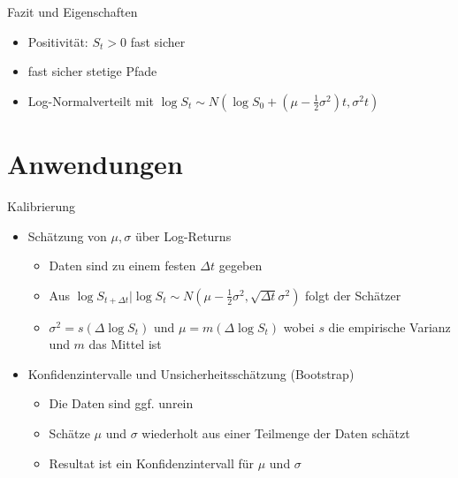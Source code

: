 \documentclass{beamer}
\begin{document}
\begin{frame}{Fazit und Eigenschaften}
  \begin{itemize}
      \item Positivität: $S_t>0$ fast sicher
      \item fast sicher stetige Pfade
      \item Log-Normalverteilt mit $\log S_t \sim N(\log S_0 + (\mu - \tfrac12 \sigma^2)t, \sigma^2 t)$
  \end{itemize}
\end{frame}

\section{Anwendungen}

\begin{frame}{Kalibrierung}
  \begin{itemize}
      \item Schätzung von $\mu,\sigma$ über Log-Returns
      \begin{itemize}
        \item Daten sind zu einem festen $\Delta t$ gegeben
        \item Aus $\log S_{t + \Delta t} \vert \log S_t \sim N(\mu - \tfrac12 \sigma^2, \sqrt{\Delta t} \sigma^2)$ folgt der Schätzer
        \item $\sigma^2 = s(\Delta \log S_t)$ und $\mu = m(\Delta \log S_t)$ wobei $s$ die empirische Varianz und $m$ das Mittel ist
      \end{itemize}
      \pause
      \item Konfidenzintervalle und Unsicherheitsschätzung (Bootstrap)
      \begin{itemize}
        \item Die Daten sind ggf. unrein
        \item Schätze $\mu$ und $\sigma$ wiederholt aus einer Teilmenge der Daten schätzt
        \item Resultat ist ein Konfidenzintervall für $\mu$ und $\sigma$
      \end{itemize}
  \end{itemize}
\end{frame}
\end{document}
